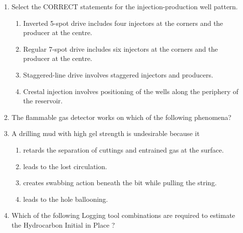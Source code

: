 \documentclass[journal,12pt,onecolumn]{IEEEtran}
\theoremstyle{remark}
\begin{document}
\begin{enumerate}
\item Select the CORRECT statements for the injection-production well pattern.

\hfill{}

\begin{enumerate}
\item Inverted 5-spot drive includes four injectors at the corners and the producer at the centre.
\item Regular 7-spot drive includes six injectors at the corners and the producer at the centre.
\item Staggered-line drive involves staggered injectors and producers.
\item Crestal injection involves positioning of the wells along the periphery of the reservoir.
\end{enumerate}

\pagebreak

\item The flammable gas detector works on which of the following phenomena?

\hfill{}

\begin{enumerate}
\end{enumerate}

\item A drilling mud with high gel strength is undesirable because it

\hfill{}

\begin{enumerate}
\item retards the separation of cuttings and entrained gas at the surface.
\item leads to the lost circulation.
\item creates swabbing action beneath the bit while pulling the string.
\item leads to the hole ballooning.
\end{enumerate}

\item Which of the following Logging tool combinations are required to estimate the Hydrocarbon Initial in Place ?


\end{enumerate}
\end{document}
